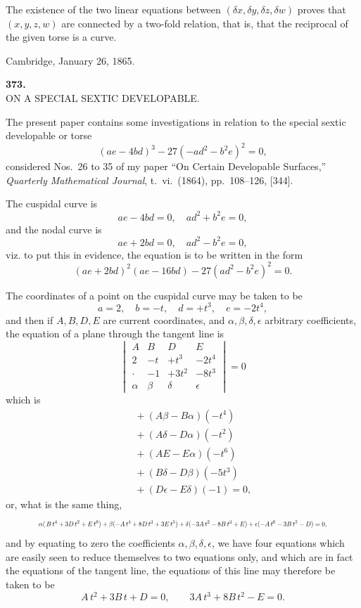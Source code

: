 \documentclass[11pt]{article}
\begin{document}
The existence of the two linear equations between $(\delta x, \delta y, \delta z, \delta w)$ proves that $(x,y,z,w)$ are connected by a two-fold relation, that is, that the reciprocal of the given torse is a curve.

\medskip\noindent Cambridge, January 26, 1865.

\bigskip

\begin{center}\textbf{373.}\\[2pt]
ON A SPECIAL SEXTIC DEVELOPABLE.\end{center}


\medskip

The present paper contains some investigations in relation to the special sextic developable or torse
\[ (ae - 4bd)^3 - 27(-ad^2 - b^2 e)^2 = 0, \]
considered Nos.~26 to 35 of my paper ``On Certain Developable Surfaces,'' \emph{Quarterly Mathematical Journal}, t.~vi.~(1864), pp.~108--126, [344].

The cuspidal curve is
\[ ae - 4bd = 0,\quad ad^2 + b^2 e = 0, \]
and the nodal curve is
\[ ae + 2bd = 0,\quad ad^2 - b^2 e = 0, \]
viz. to put this in evidence, the equation is to be written in the form
\[ (ae + 2bd)^2(ae - 16bd) - 27(ad^2 - b^2 e)^2 = 0. \]

The coordinates of a point on the cuspidal curve may be taken to be
\[ a = 2,\quad b = -t,\quad d = +t^3,\quad e = -2t^4, \]
and then if $A, B, D, E$ are current coordinates, and $\alpha, \beta, \delta, \epsilon$ arbitrary coefficients, the equation of a plane through the tangent line is
\[ \begin{vmatrix} A & B & D & E \\ 2 & -t & +t^3 & -2t^4 \\ \cdot & -1 & +3t^2 & -8t^3 \\ \alpha & \beta & \delta & \epsilon \end{vmatrix} = 0 \]
which is
\begin{align*}
&\phantom{={}}+ (A\beta - B\alpha)(-t^4) \\
&\phantom{={}}+ (A\delta - D\alpha)(-t^2)\\
&\phantom{={}}+ (AE - E\alpha)(-t^6)\\
&\phantom{={}}+ (B\delta - D\beta)(-5t^3)\\
&\phantom{={}}+ (D\epsilon - E\delta)(-1) = 0,
\end{align*}
or, what is the same thing,
\[ \resizebox{0.85\textwidth}{!}{$\displaystyle \alpha(\,B\,t^4 + 3D\,t^2 + E\,t^6) + \beta(-A\,t^4 + 8D\,t^3 + 3E\,t^5) + \delta(-3A\,t^2 - 8B\,t^3 + E) + \epsilon(-A\,t^6 - 3B\,t^5 - D) = 0,$} \]
and by equating to zero the coefficients $\alpha,\beta,\delta,\epsilon$, we have four equations which are easily seen to reduce themselves to two equations only, and which are in fact the equations of the tangent line, the equations of this line may therefore be taken to be
\[ A\,t^2 + 3B\,t + D = 0,\qquad 3A\,t^3 + 8B\,t^2 - E = 0. \]
\end{document}
